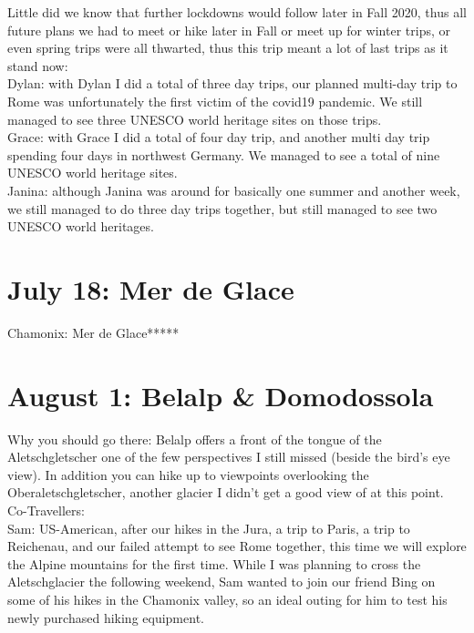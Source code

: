 Little did we know that further lockdowns would follow later in Fall 2020, thus all future plans we had to meet or hike later in Fall or meet up for winter trips, or even spring trips were all thwarted, thus this trip meant a lot of last trips as it stand now:\\
Dylan: with Dylan I did a total of three day trips, our planned multi-day trip to Rome was unfortunately the first victim of the covid19 pandemic. We still managed to see three UNESCO world heritage sites on those trips.\\
Grace: with Grace I did a total of four day trip, and another multi day trip spending four days in northwest Germany. We managed to see a total of nine UNESCO world heritage sites.\\
Janina: although Janina was around for basically one summer and another week, we still managed to do three day trips together, but still managed to see two UNESCO world heritages.\\

 \section{July 18: Mer de Glace}
\label{2020:Mer de Glace}

Chamonix: Mer de Glace*****

\section{August 1: Belalp \& Domodossola}
\label{2020:BelalpDomodossola}

Why you should go there: Belalp offers a front of the tongue of the Aletschgletscher one of the few perspectives I still missed (beside the bird's eye view). In addition you can hike up to viewpoints overlooking the Oberaletschgletscher, another glacier I didn't get a good view of at this point. \\

Co-Travellers:\\
Sam: US-American, after our hikes in the Jura, a trip to Paris, a trip to Reichenau, and our failed attempt to see Rome together, this time we will explore the Alpine mountains for the first time. While I was planning to cross the Aletschglacier the following weekend, Sam wanted to join our friend Bing on some of his hikes in the Chamonix valley, so an ideal outing for him to test his newly purchased hiking equipment.\\

